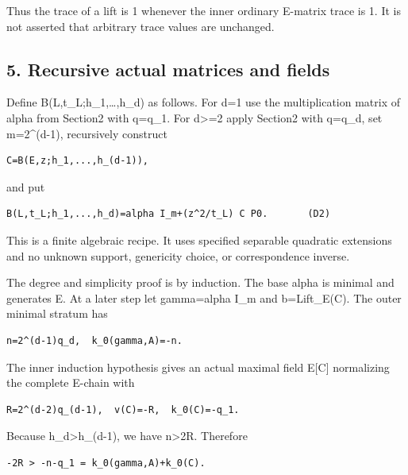 Thus the trace of a lift is 1 whenever the inner ordinary E-matrix trace
is 1. It is not asserted that arbitrary trace values are unchanged.

\hypertarget{dyadic_tower-recursive-actual-matrices-and-fields}{%
\subsection{5. Recursive actual matrices and
fields}\label{dyadic_tower-recursive-actual-matrices-and-fields}}

Define B(L,t\_L;h\_1,\ldots,h\_d) as follows. For d=1 use the
multiplication matrix of alpha from Section2 with q=q\_1. For
d\textgreater=2 apply Section2 with q=q\_d, set m=2\^{}(d-1),
recursively construct

\begin{Verbatim}[fontsize=\small,breaklines=true,breakanywhere=true]
C=B(E,z;h_1,...,h_(d-1)),
\end{Verbatim}

and put

\begin{Verbatim}[fontsize=\small,breaklines=true,breakanywhere=true]
B(L,t_L;h_1,...,h_d)=alpha I_m+(z^2/t_L) C P0.       (D2)
\end{Verbatim}

This is a finite algebraic recipe. It uses specified separable quadratic
extensions and no unknown support, genericity choice, or correspondence
inverse.

The degree and simplicity proof is by induction. The base alpha is
minimal and generates E. At a later step let gamma=alpha I\_m and
b=Lift\_E(C). The outer minimal stratum has

\begin{Verbatim}[fontsize=\small,breaklines=true,breakanywhere=true]
n=2^(d-1)q_d,  k_0(gamma,A)=-n.
\end{Verbatim}

The inner induction hypothesis gives an actual maximal field E{[}C{]}
normalizing the complete E-chain with

\begin{Verbatim}[fontsize=\small,breaklines=true,breakanywhere=true]
R=2^(d-2)q_(d-1),  v(C)=-R,  k_0(C)=-q_1.
\end{Verbatim}

Because h\_d\textgreater h\_(d-1), we have n\textgreater2R. Therefore

\begin{Verbatim}[fontsize=\small,breaklines=true,breakanywhere=true]
-2R > -n-q_1 = k_0(gamma,A)+k_0(C).
\end{Verbatim}

